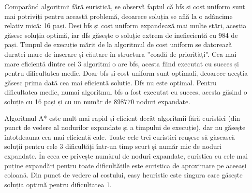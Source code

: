 \documentclass{article}
\begin{document}
Comparând algoritmii fără euristică, se observă faptul că bfs si cost uniform sunt mai potriviți pentru această problemă, deoarece soluția se află la o adâncime relativ mică: 16 pași. Deși bfs și cost uniform expandează mai multe stări, aceștia găsesc soluția optimă, iar dfs găsește o soluție extrem de inefiecientă cu 984 de pași. Timpul de execuție mărit de la algoritmul de cost uniform se datorează duratei mare de inserare și căutare în structura ”coadă de priorități”. Cea mai mare eficiență dintre cei 3 algoritmi o are bfs, acesta fiind executat cu succes și pentru dificultatea medie.
    Doar bfs și cost uniform sunt optimali, deoarece aceștia găsesc prima dată cea mai eficientă soluție. Dfs nu este optimal.
    Pentru dificultatea medie, numai algoritmul bfs a fost executat cu succes, acesta găsind o soluție cu 16 pași și cu un număr de 898770 noduri expandate.
    
    
Algoritmul A* este mult mai rapid și eficient decât algoritmii fără euristici (din punct de vedere al nodurilor expandate și a timpului de execuție), dar nu găsește întotdeauna cea mai eficientă cale. Toate cele trei euristici reușesc să găsească soluții pentru cele 3 dificultăți într-un timp scurt și număr mic de noduri expandate. În ceea ce privește numărul de noduri expandate, euristica cu cele mai puține expandări pentru toate dificultățile este euristica de aproximare pe aceeași coloană. Din punct de vedere al costului, easy heuristic este singura care găsește soluția optimă pentru dificultatea 1.
\end{document}
